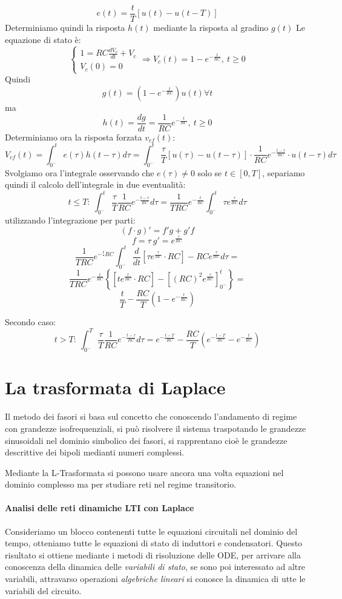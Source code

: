 $$
e(t) = \frac{t}{T}\left[u(t) - u(t-T)\right]
$$
Determiniamo quindi la risposta $h(t)$ mediante la risposta al gradino $g(t)$
Le equazione di stato è:
$$
\begin{cases}
1 = RC\frac{dV_c}{dt} + V_c \\
V_c(0) = 0 
\end{cases}
\Rightarrow V_c(t) = 1 - e^{-\frac{t}{RC}},\ t\geq 0$$
Quindi 
$$
g(t) = (1 - e^{-\frac{t}{RC}})u(t) \forall t
$$
ma
$$
h(t) = \frac{dg}{dt} = \frac{1}{RC}e^{-\frac{t}{RC}},\ t\geq 0
$$
Determiniamo ora la risposta forzata $v_{cf}(t)$:
$$
V_{cf}(t) = \int_{0^-}^{t} e(\tau) h(t-\tau)d\tau = \int_{0^-}^{t}\frac{\tau}{T}\left[u(\tau) - u(t-\tau)\right]
\cdot \frac{1}{RC} e ^{-\frac{t-\tau}{RC}}\cdot u(t-\tau)d\tau
$$
Svolgiamo ora l'integrale osservando che $e(\tau) \neq 0 $ solo se $t \in [0,T]$, separiamo quindi
il calcolo dell'integrale in due eventualità:
$$
t\leq T:\ \int_{0^-}^{t}\frac{\tau}{T}\frac{1}{RC}e^{-\frac{t-\tau}{RC}}d\tau = \frac{1}{TRC}e^{-\frac{t}{RC}}\int_{0^-}^{t}\tau e^{\frac{\tau}{RC}}d\tau 
$$
utilizzando l'integrazione per parti:
$$
\left(f\cdot g\right)' = f'g + g'f
$$
$$
f = \tau\ g' = e^{\frac{\tau}{RC}}
$$
$$
\frac{1}{TRC}e^{-\frac{t}{}RC}\int_{0^-}^{t}\frac{d}{dt}\left[\tau e^{\frac{\tau}{RC}}\cdot RC \right] -
RC e^{\frac{\tau}{RC}} d\tau =
$$
$$
\frac{1}{TRC} e^{-\frac{t}{RC}} \left\{ \left[t e^{\frac{t}{RC}}\cdot RC \right] - \left[(RC)^2 e^{\frac{\tau}{RC}} \right]_{0^-}^{t}  \right\} =
$$
$$
\frac{t}{T} - \frac{RC}{T}\left(1-e^{-\frac{t}{RC}}\right)
$$

Secondo caso:
$$
t > T:\ \int_{0^-}^{T} \frac{\tau}{T}\frac{1}{RC} e^{-\frac{t-\tau}{RC}}d\tau =  e^{-\frac{t-T}{RC}}-\frac{RC}{T}\left(e^{-\frac{t-T}{RC}} -e^{-\frac{t}{RC}} \right)
$$

\section{La trasformata di Laplace}
Il metodo dei fasori si basa sul concetto che conoscendo l'andamento di regime con grandezze isofrequenziali, si può risolvere il sistema traspotando le grandezze sinusoidali nel dominio simbolico
dei fasori, si rapprentano cioè le grandezze descrittive dei bipoli medianti numeri complessi.

Mediante la L-Trasformata si possono usare ancora una volta equazioni nel dominio complesso ma per 
studiare reti nel regime transitorio.

\paragraph{Analisi delle reti dinamiche LTI con Laplace}
Consideriamo un blocco contenenti tutte le equazioni circuitali nel dominio del tempo,
otteniamo tutte le equazioni di stato di induttori e condensatori.
Questo risultato si ottiene mediante i metodi di risoluzione delle ODE, per arrivare alla conoscenza
della dinamica delle \textit{variabili di stato}, se sono poi interessato ad altre variabili, attravarso
operazioni \textit{algebriche lineari} si conosce la dinamica di utte le variabili del circuito.

